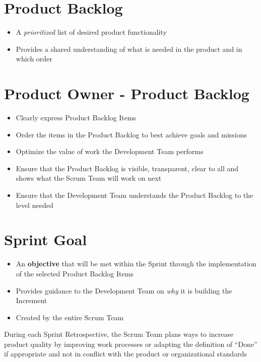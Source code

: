 \documentclass[a4paper,11pt,twocolumn]{article}
\begin{document}

\section*{Product Backlog}
\begin{itemize}
	\item A \textit{prioritized} list of desired product functionality
	\item Provides a shared understanding of what is needed in the product and in which order
\end{itemize}

\section*{Product Owner - Product Backlog}
\begin{itemize}
	\item Clearly express Product Backlog Items
	\item Order the items in the Product Backlog to best achieve goals and missions
	\item Optimize the value of work the Development Team performs
	\item Ensure that the Product Backlog is visible, transparent, clear to all and shows what the Scrum Team will work on next
	\item Ensure that the Development Team understands the Product Backlog to the level needed
\end{itemize}

\section*{Sprint Goal}
\begin{itemize}
	\item An \textbf{objective} that will be met within the Sprint through the implementation of the selected Product Backlog Items
	\item Provides guidance to the Development Team on \textit{why} it is building the Increment
	\item Created by the entire Scrum Team
\end{itemize}

\begin{tcolorbox}[colback=black!8!white,colframe=gray!50!black,title=Note,sharp corners,fonttitle=\normalsize\bfseries,fontupper=\normalsize,left=0.7em,right=0.7em]
	During each Sprint Retrospective, the Scrum Team plans ways to increase product quality by improving work processes or adapting the definition of ``Done'' if appropriate and not in conflict with the product or organizational standards
\end{tcolorbox}
\end{document}
